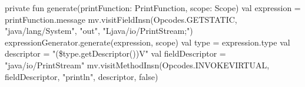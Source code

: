 \begin{KotlinCode}[numbers=none, caption={Bytecode zum Aufruf der \texttt{println} Funktion von Java}]
private fun generate(printFunction: PrintFunction, scope: Scope) {
    val expression = printFunction.message
    mv.visitFieldInsn(Opcodes.GETSTATIC, "java/lang/System", "out", "Ljava/io/PrintStream;")
    expressionGenerator.generate(expression, scope)
    val type = expression.type
    val descriptor = "(\${type.getDescriptor()})V"
    val fieldDescriptor = "java/io/PrintStream"
    mv.visitMethodInsn(Opcodes.INVOKEVIRTUAL, fieldDescriptor, "println", descriptor, false)
}
\end{KotlinCode}
